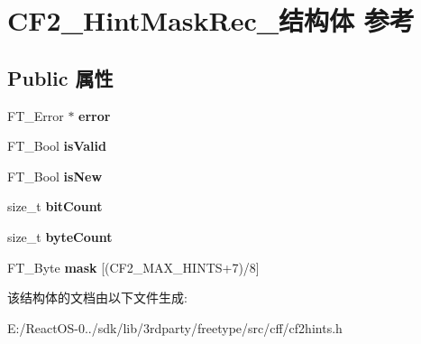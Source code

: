 \hypertarget{struct_c_f2___hint_mask_rec__}{}\section{C\+F2\+\_\+\+Hint\+Mask\+Rec\+\_\+结构体 参考}
\label{struct_c_f2___hint_mask_rec__}
\subsection*{Public 属性}
\begin{DoxyCompactItemize}
\item 
\mbox{\label{struct_c_f2___hint_mask_rec___a7943c5df02381c4544e88c7a25d95c8a}} 
F\+T\+\_\+\+Error $\ast$ {\bfseries error}
\item 
\mbox{\label{struct_c_f2___hint_mask_rec___a90b470e87a8133475f9917cec37c3119}} 
F\+T\+\_\+\+Bool {\bfseries is\+Valid}
\item 
\mbox{\label{struct_c_f2___hint_mask_rec___a29e9bee8e7660f1dcee71b16a55b5bfe}} 
F\+T\+\_\+\+Bool {\bfseries is\+New}
\item 
\mbox{\label{struct_c_f2___hint_mask_rec___ad4bd9a866e457bef3650b7dda81e81bd}} 
size\+\_\+t {\bfseries bit\+Count}
\item 
\mbox{\label{struct_c_f2___hint_mask_rec___a610d244e7207eae85e7bafd40b73b713}} 
size\+\_\+t {\bfseries byte\+Count}
\item 
\mbox{\label{struct_c_f2___hint_mask_rec___afff8109d9b145207de059a0b9b3016ef}} 
F\+T\+\_\+\+Byte {\bfseries mask} \mbox{[}(C\+F2\+\_\+\+M\+A\+X\+\_\+\+H\+I\+N\+TS+7)/8\mbox{]}
\end{DoxyCompactItemize}


该结构体的文档由以下文件生成\+:\begin{DoxyCompactItemize}
\item 
E\+:/\+React\+O\+S-\/0../sdk/lib/3rdparty/freetype/src/cff/cf2hints.\+h\end{DoxyCompactItemize}
